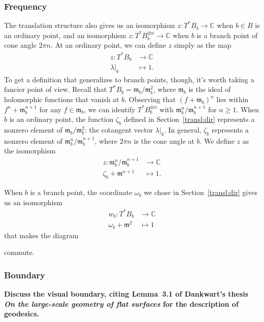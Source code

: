 \documentclass{article}
\newcommand{\maps}{\colon}
\newcommand{\C}{\mathbb{C}}
\newcommand{\blankbox}{{\fboxsep 0pt \colorbox{lightgray}{\phantom{$h$}}}}
\newcommand{\van}{\mathfrak{m}}
\begin{document}
\subsubsection{Frequency}\label{transl-freq}
The translation structure also gives us an isomorphism $z \maps T^*B_b \to \C$ when $b \in B$ is an ordinary point, and an isomorphism $z \maps T^*B_b^{\otimes n} \to \C$ when $b$ is a branch point of cone angle $2\pi n$. At an ordinary point, we can define $z$ simply as the map
\begin{align*}
z \maps T^*B_b & \to \C \\
\lambda\big|_b & \mapsto 1.
\end{align*}
To get a definition that generalizes to branch points, though, it's worth taking a fancier point of view. Recall that $T^*B_b = \van_b / \van_b^2$, where $\van_b$ is the ideal of holomorphic functions that vanish at $b$. Observing that $(f + \van_b)^n$ lies within $f^n + \van_b^{n+1}$ for any $f \in \van_b$, we can identify $T^*B_b^{\otimes n}$ with $\van_b^n / \van_b^{n+1}$ for $n \ge 1$. When $b$ is an ordinary point, the function $\zeta_b$ defined in Section~\ref{transl:dir} represents a nonzero element of $\van_b / \van_b^2$: the cotangent vector $\lambda\big|_b$. In general, $\zeta_b$ represents a nonzero element of $\van_b^n / \van_b^{n+1}$, where $2\pi n$ is the cone angle at $b$. We define $z$ as the isomorphism
\begin{align*}
z \maps \van_b^n / \van_b^{n+1} & \to \C \\
\zeta_b + \van^{n+1} & \mapsto 1.
\end{align*}

When $b$ is a branch point, the coordinate $\omega_b$ we chose in Section~\ref{transl:dir} gives us an isomorphism
\begin{align*}
w_b \maps T^*B_b & \to \C \\
\omega_b + \van^2 & \mapsto 1
\end{align*}
that makes the diagram
\begin{center}
\end{center}
commute.
\subsubsection{Boundary}
\textbf{Discuss the visual boundary, citing Lemma~3.1 of Dankwart's thesis \textit{On the large-scale geometry of flat surfaces} for the description of geodesics.}
\end{document}
